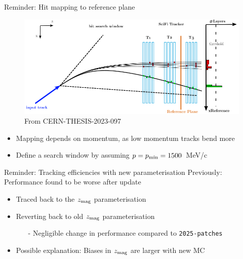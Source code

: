 \documentclass[xcolor={dvipsnames}]{beamer}
\begin{document}
\begin{frame}{Reminder: Hit mapping to reference plane}
  \vspace{0.0cm}
  \begin{figure}[htb]
    \centering
    \includegraphics[width=1\textwidth]{Plots/HoughTransform.png}
  \caption*{\small From CERN-THESIS-2023-097}
  \end{figure}
  \vspace{-0.3cm}
  \begin{itemize}
    \item{Mapping depends on momentum, as low momentum tracks bend more}
    \item{Define a search window by assuming $p = p_{\rm min} = 1500$~MeV/c}
  \end{itemize}
\end{frame}

\begin{frame}{Reminder: Tracking efficiencies with new parameterisation}
  \vspace{0.0cm}
  {\Large Previously: Performance found to be worse after update}
  \vspace{0.5cm}
  \begin{itemize}
    \setlength\itemsep{1.0em}
    \item{Traced back to the $z_{\rm mag}$ parameterisation}
    \item{Reverting back to old $z_{\rm mag}$ parameterisation}
    \begin{itemize}
      \item[-]{Negligible change in performance compared to \texttt{2025-patches}}
    \end{itemize}
    \item{Possible explanation: Biases in $z_{\rm mag}$ are larger with new MC}
  \end{itemize}
\end{frame}
\end{document}
